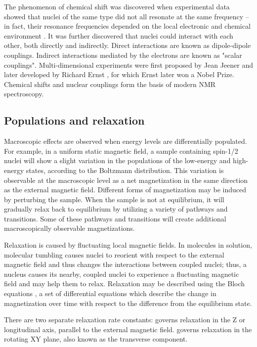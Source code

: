 The phenomenon of chemical shift was discovered when experimental data showed
that nuclei of the same type did not all resonate at the same frequency -- in
fact, their resonance frequencies depended on the local electronic and 
chemical environment \cite{arnold1951variations}.  
It was further discovered that nuclei could interact
with each other, both directly and indirectly.  Direct interactions are 
known as dipole-dipole couplings.  Indirect interactions mediated
by the electrons are known as "scalar couplings".
Multi-dimensional experiments were first proposed by Jean Jeener 
\cite{jeener1979investigation} and later developed by Richard Ernst
\cite{ernst1992nuclear}, for which Ernst later won a Nobel Prize.  
Chemical shifts and nuclear couplings form the basis of modern NMR 
spectroscopy.


\subsection*{Populations and relaxation}

Macroscopic effects are observed when energy levels are differentially 
populated.  For example, in a uniform static magnetic field, a sample 
containing spin-1/2 nuclei will show a slight variation in the populations of 
the low-energy and high-energy states, according to the Boltzmann distribution.  
This variation is observable at the macroscopic level as a net magnetization in 
the same direction as the external magnetic field.  Different forms of magnetization
may be induced by perturbing the sample.  When the sample is not at equilibrium,
it will gradually relax back to equilibrium by utilizing a variety of
pathways and transitions.  Some of these pathways and transitions will create
additional macroscopically observable magnetizations.

Relaxation is caused by fluctuating local magnetic fields.
In molecules in solution, molecular tumbling causes nuclei to reorient with
respect to the external magnetic field and thus changes the interactions
between coupled nuclei; thus, a nucleus causes its nearby, coupled nuclei to
experience a fluctuating magnetic field and may help them to relax.
Relaxation may be described using the Bloch equations \cite{bloch1946nuclear},
a set of differential equations which describe the change in magnetization 
over time with respect to the difference from the equilibrium state.

There are two separate relaxation rate constants: \mattftone{} governs 
relaxation in the Z or longitudinal axis, parallel to the external magnetic
field.  \mattfttwo{} governs relaxation in the rotating XY plane, also known
as the transverse component.


